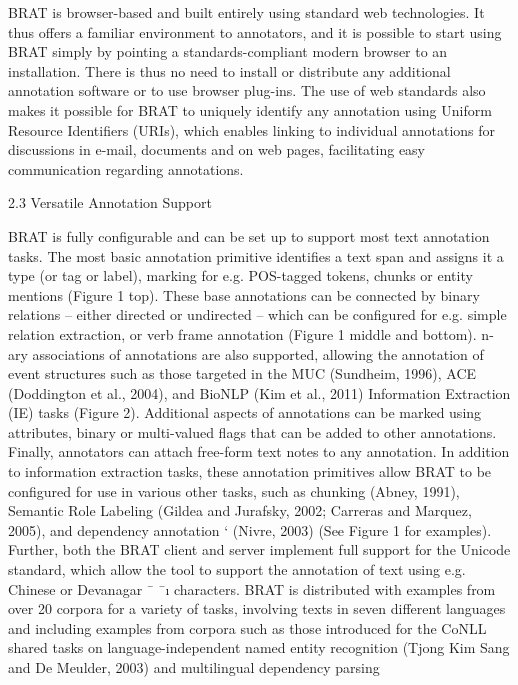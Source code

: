 \begin{description}
    BRAT is browser-based and built entirely using
    standard web technologies. It thus offers a familiar environment to annotators, and it is possible to start using BRAT simply by pointing a
    standards-compliant modern browser to an installation. There is thus no need to install or distribute any additional annotation software or to
    use browser plug-ins. The use of web standards
    also makes it possible for BRAT to uniquely identify any annotation using Uniform Resource Identifiers (URIs), which enables linking to individual
    annotations for discussions in e-mail, documents
    and on web pages, facilitating easy communication regarding annotations.

    2.3 Versatile Annotation Support

    BRAT is fully configurable and can be set up to
    support most text annotation tasks. The most basic annotation primitive identifies a text span and
    assigns it a type (or tag or label), marking for e.g.
    POS-tagged tokens, chunks or entity mentions
    (Figure 1 top). These base annotations can be
    connected by binary relations – either directed or
    undirected – which can be configured for e.g. simple relation extraction, or verb frame annotation
    (Figure 1 middle and bottom). n-ary associations
    of annotations are also supported, allowing the annotation of event structures such as those targeted
    in the MUC (Sundheim, 1996), ACE (Doddington
    et al., 2004), and BioNLP (Kim et al., 2011) Information Extraction (IE) tasks (Figure 2). Additional aspects of annotations can be marked using
    attributes, binary or multi-valued flags that can
    be added to other annotations. Finally, annotators
    can attach free-form text notes to any annotation.
    In addition to information extraction tasks,
    these annotation primitives allow BRAT to be
    configured for use in various other tasks, such
    as chunking (Abney, 1991), Semantic Role Labeling (Gildea and Jurafsky, 2002; Carreras
    and Marquez, 2005), and dependency annotation `
    (Nivre, 2003) (See Figure 1 for examples). Further, both the BRAT client and server implement
    full support for the Unicode standard, which allow the tool to support the annotation of text using e.g. Chinese or Devanagar ¯ ¯ı characters. BRAT
    is distributed with examples from over 20 corpora for a variety of tasks, involving texts in seven
    different languages and including examples from
    corpora such as those introduced for the CoNLL
    shared tasks on language-independent named entity recognition (Tjong Kim Sang and De Meulder, 2003) and multilingual dependency parsing

\end{description}
